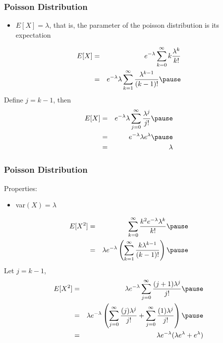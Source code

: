 \documentclass[handout]{beamer}
\numberwithin{equation}{section}
\begin{document}
\begin{frame}
\frametitle{Poisson Distribution}

\begin{itemize}
\item[2)] $E[X] = \lambda$, that is, the parameter of the poisson distribution is its expectation
\end{itemize}
\begin{eqnarray}
E[X] & = & e^{-\lambda} \sum_{k=0}^{\infty} k \frac{\lambda^{k}}{k!} \nonumber \\
& = & e^{-\lambda} \lambda \sum_{k=1}^{\infty} \frac{\lambda^{k-1}}{(k-1)!} \nonumber \pause
\end{eqnarray}
Define $j = k-1$, then 
\begin{eqnarray}
E[X]  & = & e^{-\lambda} \lambda \sum_{j=0}^{\infty} \frac{\lambda^{j}}{j!} \nonumber \pause\\
& = & e^{-\lambda} \lambda e^{\lambda} \nonumber \pause\\
& = & \lambda \nonumber 
\end{eqnarray}



\end{frame}

\begin{frame}
\frametitle{Poisson Distribution}
Properties:

\begin{itemize}
\item[3)] var$(X) = \lambda$\pause
\end{itemize}

\begin{eqnarray}
E[X^2] & = & \sum_{k=0}^{\infty} \frac{k^2 e^{-\lambda} \lambda^{k}}{k!} \nonumber \pause\\
& = & \lambda e^{-\lambda} \left(\sum_{k=1}^{\infty} \frac{k \lambda^{k-1}}{(k-1)!}\right)\nonumber \pause
\end{eqnarray}
Let $j = k-1$,\pause
\begin{eqnarray}
E[X^2] & = & \lambda e^{-\lambda} \sum_{j=0}^{\infty} \frac{(j+1) \lambda^{j}}{j!} \nonumber \pause \\
& = & \lambda e^{-\lambda} \left(\sum_{j=0}^{\infty} \frac{(j) \lambda^{j}}{j!} + \sum_{j=0}^{\infty} \frac{(1) \lambda^{j}}{j!} \right) \nonumber \pause \\
& = & \lambda e^{-\lambda} (\lambda e^{\lambda} + e^{\lambda} ) \nonumber \\
\end{eqnarray}


\end{frame}
\end{document}
